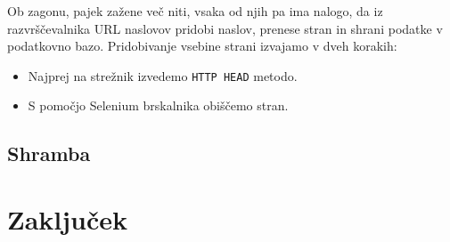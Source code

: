 \documentclass[conference]{IEEEtran}
\begin{document}
	Ob zagonu, pajek zažene več niti, vsaka od njih pa ima nalogo, da iz razvrščevalnika URL naslovov pridobi naslov, prenese stran in shrani podatke v podatkovno bazo. Pridobivanje vsebine strani izvajamo v dveh korakih:
	
	\begin{itemize}
		\item Najprej na strežnik izvedemo \texttt{HTTP HEAD} metodo.
		\item S pomočjo Selenium brskalnika obiščemo stran.
	\end{itemize}
	
	\subsection{Shramba}
	
	
	
	\section{Zaključek}
	
	
\end{document}
